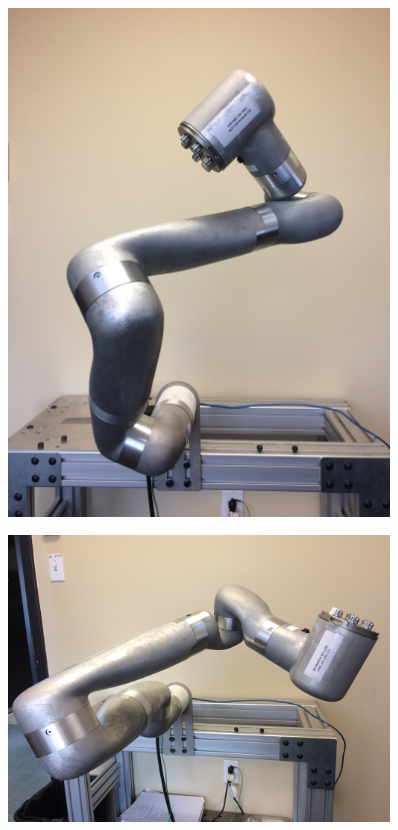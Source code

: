 \begin{figure}
\begin{minipage}{.5\textwidth}
		\label{fig:pose2}
	\end{minipage}
\end{figure}

\begin{figure}
	\centering
	\begin{minipage}{.5\textwidth}
		\centering
		\includegraphics[width=0.9\textwidth]{./images/Pose3}
		\label{fig:pose3}
	\end{minipage}%
	\begin{minipage}{.5\textwidth}
		\centering
		\includegraphics[width=0.9\textwidth]{./images/Pose4}
		\label{fig:pose4}
	\end{minipage}
\end{figure}

